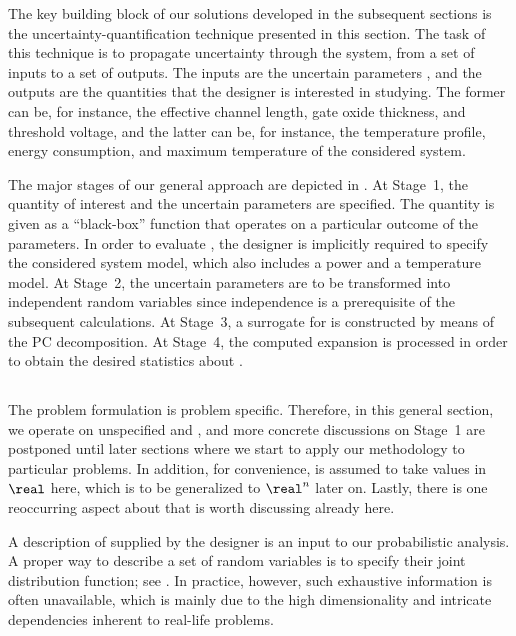 The key building block of our solutions developed in the subsequent sections is
the uncertainty-quantification technique presented in this section. The task of
this technique is to propagate uncertainty through the system, from a set of
inputs to a set of outputs. The inputs are the uncertain parameters \vu, and the
outputs are the quantities that the designer is interested in studying. The
former can be, for instance, the effective channel length, gate oxide thickness,
and threshold voltage, and the latter can be, for instance, the temperature
profile, energy consumption, and maximum temperature of the considered system.

The major stages of our general approach are depicted in .
At Stage~1, the quantity of interest \g and the uncertain parameters \vu are
specified. The quantity is given as a ``black-box'' function that operates on a
particular outcome of the parameters. In order to evaluate \g, the designer is
implicitly required to specify the considered system model, which also includes
a power and a temperature model. At Stage~2, the uncertain parameters \vu are to
be transformed into independent random variables \vz since independence is a
prerequisite of the subsequent calculations. At Stage~3, a surrogate for \g is
constructed by means of the \ac{PC} decomposition. At Stage~4, the computed
expansion is processed in order to obtain the desired statistics about \g.

\subsection{\problemtitle}

The problem formulation is problem specific. Therefore, in this general section,
we operate on unspecified \g and \vu, and more concrete discussions on Stage~1
are postponed until later sections where we start to apply our methodology to
particular problems. In addition, for convenience, \g is assumed to take values
in $\real$ here, which is to be generalized to $\real^n$ later on. Lastly, there
is one reoccurring aspect about \vu that is worth discussing already here.

A description of \vu supplied by the designer is an input to our probabilistic
analysis. A proper way to describe a set of random variables is to specify their
joint distribution function; see . In practice,
however, such exhaustive information is often unavailable, which is mainly due
to the high dimensionality and intricate dependencies inherent to real-life
problems.

